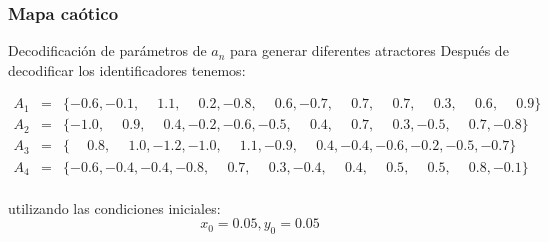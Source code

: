 \documentclass[10pt]{beamer}
\begin{document}
\begin{frame}
    \frametitle{Mapa caótico}
    \begin{block}{Decodificación de parámetros de $a_{n}$ para generar diferentes atractores}
        \justifying
        Después de decodificar los identificadores  tenemos:
        \begin{footnotesize}
            \begin{equation*}
             \begin{array}{lcl}
                A_{1} & = & \{ -0.6, -0.1, \phantom{-}1.1, \phantom{-}0.2, -0.8, \phantom{-}0.6, -0.7, \phantom{-}0.7, \phantom{-}0.7, \phantom{-}0.3, \phantom{-}0.6, \phantom{-}0.9 \}\\
                A_{2} & = & \{ -1.0, \phantom{-}0.9, \phantom{-}0.4, -0.2, -0.6, -0.5, \phantom{-}0.4, \phantom{-}0.7, \phantom{-}0.3, -0.5, \phantom{-}0.7, -0.8 \}\\
                A_{3} & = &  \{\phantom{-}0.8, \phantom{-}1.0, -1.2, -1.0, \phantom{-}1.1, -0.9, \phantom{-}0.4, -0.4, -0.6, -0.2, -0.5, -0.7 \}\\
                A_{4} & = & \{-0.6, -0.4, -0.4, -0.8, \phantom{-}0.7, \phantom{-}0.3, -0.4, \phantom{-}0.4, \phantom{-}0.5, \phantom{-}0.5, \phantom{-}0.8, -0.1 \}\\
            \end{array}
            \end{equation*}
        \end{footnotesize}
        utilizando las condiciones iniciales:
        \begin{equation}
            x_{0} =  0.05,  y_{0} = 0.05
        \end{equation}
	\end{block}
\end{frame}
\end{document}
